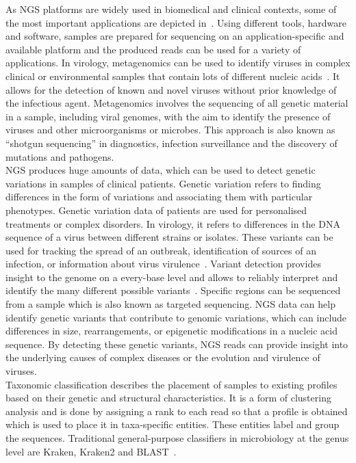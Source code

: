 As \ac{NGS} platforms are widely used in biomedical and clinical contexts, some of the most important applications are depicted in~. Using different tools, hardware and software, samples are prepared for sequencing on an application-specific and available platform and the produced reads can be used for a variety of applications. In virology, metagenomics can be used to identify viruses in complex clinical or environmental samples that contain lots of different nucleic acids~\cite{chiu2019clinical}. It allows for the detection of known and novel viruses without prior knowledge of the infectious agent. Metagenomics involves the sequencing of all genetic material in a sample, including viral genomes, with the aim to identify the presence of viruses and other microorganisms or microbes. This approach is also known as ``shotgun sequencing'' in diagnostics, infection surveillance and the discovery of mutations and pathogens. \\
\ac{NGS} produces huge amounts of data, which can be used to detect genetic variations in samples of clinical patients. Genetic variation refers to finding differences in the form of variations and associating them with particular phenotypes. Genetic variation data of patients are used for personalised treatments or complex disorders. In virology, it refers to differences in the \ac{DNA} sequence of a virus between different strains or isolates. These variants can be used for tracking the spread of an outbreak, identification of sources of an infection, or information about virus virulence~\cite{capobianchi2013next}. Variant detection provides insight to the genome on a every-base level and allows to reliably interpret and identify the many different possible variants~\cite{koboldt2013next}. Specific regions can be sequenced from a sample which is also known as targeted sequencing. \ac{NGS} data can help identify genetic variants that contribute to genomic variations, which can include differences in size, rearrangements, or epigenetic modifications in a nucleic acid sequence. By detecting these genetic variants, \ac{NGS} reads can provide insight into the underlying causes of complex diseases or the evolution and virulence of viruses. \\ 
Taxonomic classification describes the placement of samples to existing profiles based on their genetic and structural characteristics. It is a form of clustering analysis and is done by assigning a rank to each read so that a profile is obtained which is used to place it in taxa-specific entities. These entities label and group the sequences. Traditional general-purpose classifiers in microbiology at the genus level are Kraken, Kraken2 and \ac{BLAST}~\cite{wood2014kraken, wood2019improved, altschul1997gapped}.
